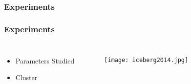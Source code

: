  \begin{frame}
        \frametitle{Experiments}
        \centering
        
        
\end{frame}

\begin{frame}
        \frametitle{Experiments}
        \begin{columns}
        \begin{itemize}
          \item Parameters Studied
          \item Cluster
        \end{itemize}
          \begin{figure}
            \texttt{[image: iceberg2014.jpg]}
          \end{figure}
      \end{columns}
\end{frame}
